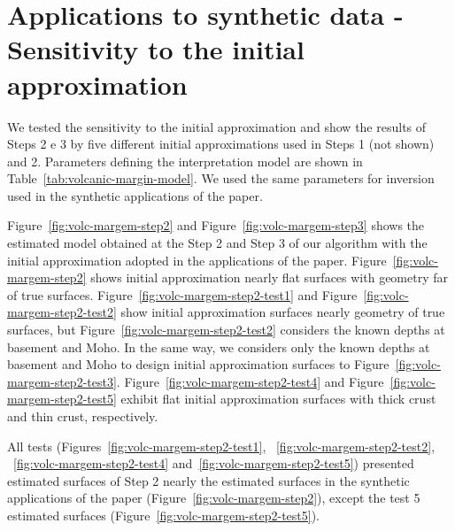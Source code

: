 \documentclass[manuscript]{geophysics}
\begin{document}
\section{Applications to synthetic data - Sensitivity to the initial approximation}

We tested the sensitivity to the initial approximation and show the results of Steps 2 e 3 by five different initial approximations used in Steps 1 (not shown) and 2. Parameters defining the interpretation model are shown in Table~\ref{tab:volcanic-margin-model}.  We used the same parameters for inversion used in the synthetic applications of the paper.

Figure~\ref{fig:volc-margem-step2} and Figure~\ref{fig:volc-margem-step3} shows the estimated model obtained at the Step 2 and Step 3 of our algorithm with the initial approximation adopted in the applications of the paper. Figure~\ref{fig:volc-margem-step2} shows initial approximation nearly flat surfaces with geometry far of true surfaces. 
Figure~\ref{fig:volc-margem-step2-test1} and Figure~\ref{fig:volc-margem-step2-test2} show initial approximation surfaces nearly geometry of true surfaces, but Figure~\ref{fig:volc-margem-step2-test2} considers the known depths at basement and Moho. In the same way, we considers only the known depths at basement and Moho to design initial approximation surfaces to Figure~\ref{fig:volc-margem-step2-test3}. Figure~\ref{fig:volc-margem-step2-test4} and Figure~\ref{fig:volc-margem-step2-test5} exhibit flat initial approximation surfaces with thick crust and thin crust, respectively. 

All tests (Figures~\ref{fig:volc-margem-step2-test1}, ~\ref{fig:volc-margem-step2-test2}, ~\ref{fig:volc-margem-step2-test4} and~\ref{fig:volc-margem-step2-test5}) presented estimated surfaces of Step 2 nearly the estimated surfaces in the synthetic applications of the paper (Figure~\ref{fig:volc-margem-step2}), except the test 5 estimated surfaces (Figure~\ref{fig:volc-margem-step2-test5}).
\end{document}
